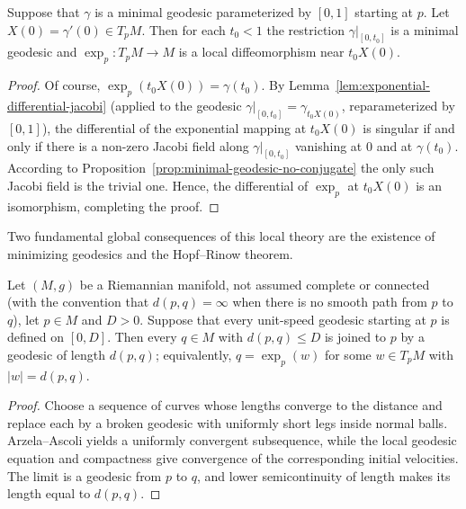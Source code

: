 \begin{corollary}
\label{cor:exponential-local-diffeomorphism}
\label{star}



Suppose that $\gamma$ is a minimal geodesic parameterized by $[0,1]$
starting at $p$. Let $X(0)=\gamma'(0)\in T_pM$. Then for each
$t_0<1$ the restriction $\gamma|_{[0,t_0]}$ is a minimal geodesic
and $\exp_p\colon T_pM\to M$ is a local diffeomorphism near
$t_0X(0)$.
\end{corollary}

\begin{proof}
\sketch
{}
Of course, $\exp_p(t_0X(0))=\gamma(t_0)$. By
Lemma~\ref{lem:exponential-differential-jacobi} (applied to the
geodesic $\gamma|_{[0,t_0]}=\gamma_{t_0X(0)}$, reparameterized by
$[0,1]$), the differential of the
exponential mapping at $t_0X(0)$ is singular if and only if there
is a non-zero
Jacobi field along $\gamma|_{[0,t_0]}$ vanishing at $0$ and at
$\gamma(t_0)$. According
to  Proposition~\ref{prop:minimal-geodesic-no-conjugate} the only such Jacobi field is the
trivial one. Hence, the differential of $\exp_p$ at $t_0X(0)$
is an isomorphism, completing the proof.
\end{proof}

Two fundamental global consequences of this local theory are the
existence of minimizing geodesics and the Hopf--Rinow theorem.

\begin{lemma}
\label{lem:minimizing-geodesic-exists}

Let $(M,g)$ be a Riemannian manifold, not assumed complete or
connected (with the convention that $d(p,q)=\infty$ when there is
no smooth path from $p$ to $q$), let $p\in M$ and $D>0$. Suppose
that every unit-speed
geodesic starting at $p$ is defined on $[0,D]$. Then every $q\in
M$ with $d(p,q)\le D$ is joined to $p$ by a geodesic of length
$d(p,q)$; equivalently, $q=\exp_p(w)$ for some $w\in T_pM$ with
$|w|=d(p,q)$.
\end{lemma}

\begin{proof}
\sketch
{}
Choose a sequence of curves whose lengths converge to the distance and replace each by a broken geodesic with uniformly short legs inside normal balls. Arzela--Ascoli yields a uniformly convergent subsequence, while the local geodesic equation and compactness give convergence of the corresponding initial velocities. The limit is a geodesic from $p$ to $q$, and lower semicontinuity of length makes its length equal to $d(p,q)$.
\end{proof}

